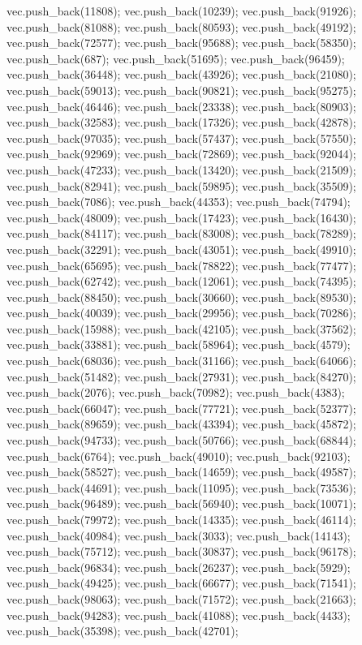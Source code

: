 vec.push_back(11808);
vec.push_back(10239);
vec.push_back(91926);
vec.push_back(81088);
vec.push_back(80593);
vec.push_back(49192);
vec.push_back(72577);
vec.push_back(95688);
vec.push_back(58350);
vec.push_back(687);
vec.push_back(51695);
vec.push_back(96459);
vec.push_back(36448);
vec.push_back(43926);
vec.push_back(21080);
vec.push_back(59013);
vec.push_back(90821);
vec.push_back(95275);
vec.push_back(46446);
vec.push_back(23338);
vec.push_back(80903);
vec.push_back(32583);
vec.push_back(17326);
vec.push_back(42878);
vec.push_back(97035);
vec.push_back(57437);
vec.push_back(57550);
vec.push_back(92969);
vec.push_back(72869);
vec.push_back(92044);
vec.push_back(47233);
vec.push_back(13420);
vec.push_back(21509);
vec.push_back(82941);
vec.push_back(59895);
vec.push_back(35509);
vec.push_back(7086);
vec.push_back(44353);
vec.push_back(74794);
vec.push_back(48009);
vec.push_back(17423);
vec.push_back(16430);
vec.push_back(84117);
vec.push_back(83008);
vec.push_back(78289);
vec.push_back(32291);
vec.push_back(43051);
vec.push_back(49910);
vec.push_back(65695);
vec.push_back(78822);
vec.push_back(77477);
vec.push_back(62742);
vec.push_back(12061);
vec.push_back(74395);
vec.push_back(88450);
vec.push_back(30660);
vec.push_back(89530);
vec.push_back(40039);
vec.push_back(29956);
vec.push_back(70286);
vec.push_back(15988);
vec.push_back(42105);
vec.push_back(37562);
vec.push_back(33881);
vec.push_back(58964);
vec.push_back(4579);
vec.push_back(68036);
vec.push_back(31166);
vec.push_back(64066);
vec.push_back(51482);
vec.push_back(27931);
vec.push_back(84270);
vec.push_back(2076);
vec.push_back(70982);
vec.push_back(4383);
vec.push_back(66047);
vec.push_back(77721);
vec.push_back(52377);
vec.push_back(89659);
vec.push_back(43394);
vec.push_back(45872);
vec.push_back(94733);
vec.push_back(50766);
vec.push_back(68844);
vec.push_back(6764);
vec.push_back(49010);
vec.push_back(92103);
vec.push_back(58527);
vec.push_back(14659);
vec.push_back(49587);
vec.push_back(44691);
vec.push_back(11095);
vec.push_back(73536);
vec.push_back(96489);
vec.push_back(56940);
vec.push_back(10071);
vec.push_back(79972);
vec.push_back(14335);
vec.push_back(46114);
vec.push_back(40984);
vec.push_back(3033);
vec.push_back(14143);
vec.push_back(75712);
vec.push_back(30837);
vec.push_back(96178);
vec.push_back(96834);
vec.push_back(26237);
vec.push_back(5929);
vec.push_back(49425);
vec.push_back(66677);
vec.push_back(71541);
vec.push_back(98063);
vec.push_back(71572);
vec.push_back(21663);
vec.push_back(94283);
vec.push_back(41088);
vec.push_back(4433);
vec.push_back(35398);
vec.push_back(42701);
